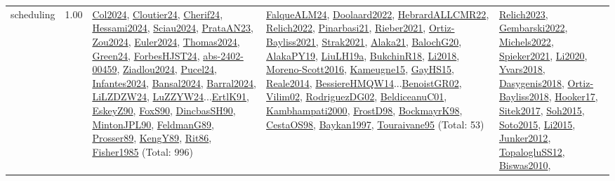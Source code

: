 {\begin{longtable}{p{3cm}r>{\raggedright\arraybackslash}p{6cm}>{\raggedright\arraybackslash}p{6cm}>{\raggedright\arraybackslash}p{8cm}}
\index{scheduling}\index{Scheduling!scheduling}scheduling &  1.00 & \hyperref[detail:Col2024]{Col2024}, \hyperref[detail:Cloutier24]{Cloutier24}, \hyperref[detail:Cherif24]{Cherif24}, \hyperref[detail:Hessami2024]{Hessami2024}, \hyperref[detail:Sciau2024]{Sciau2024}, \hyperref[detail:PrataAN23]{PrataAN23}, \hyperref[detail:Zou2024]{Zou2024}, \hyperref[detail:Euler2024]{Euler2024}, \hyperref[detail:Thomas2024]{Thomas2024}, \hyperref[detail:Green24]{Green24}, \hyperref[detail:ForbesHJST24]{ForbesHJST24}, \hyperref[detail:abs-2402-00459]{abs-2402-00459}, \hyperref[detail:Ziadlou2024]{Ziadlou2024}, \hyperref[detail:Pucel24]{Pucel24}, \hyperref[detail:Infantes2024]{Infantes2024}, \hyperref[detail:Bansal2024]{Bansal2024}, \hyperref[detail:Barral2024]{Barral2024}, \hyperref[detail:LiLZDZW24]{LiLZDZW24}, \hyperref[detail:LuZZYW24]{LuZZYW24}...\hyperref[detail:ErtlK91]{ErtlK91}, \hyperref[detail:EskeyZ90]{EskeyZ90}, \hyperref[detail:FoxS90]{FoxS90}, \hyperref[detail:DincbasSH90]{DincbasSH90}, \hyperref[detail:MintonJPL90]{MintonJPL90}, \hyperref[detail:FeldmanG89]{FeldmanG89}, \hyperref[detail:Prosser89]{Prosser89}, \hyperref[detail:KengY89]{KengY89}, \hyperref[detail:Rit86]{Rit86}, \hyperref[detail:Fisher1985]{Fisher1985} (Total: 996) & \hyperref[detail:FalqueALM24]{FalqueALM24}, \hyperref[detail:Doolaard2022]{Doolaard2022}, \hyperref[detail:HebrardALLCMR22]{HebrardALLCMR22}, \hyperref[detail:Relich2022]{Relich2022}, \hyperref[detail:Pinarbasi21]{Pinarbasi21}, \hyperref[detail:Rieber2021]{Rieber2021}, \hyperref[detail:Ortiz-Bayliss2021]{Ortiz-Bayliss2021}, \hyperref[detail:Strak2021]{Strak2021}, \hyperref[detail:Alaka21]{Alaka21}, \hyperref[detail:BalochG20]{BalochG20}, \hyperref[detail:AlakaPY19]{AlakaPY19}, \hyperref[detail:LiuLH19a]{LiuLH19a}, \hyperref[detail:BukchinR18]{BukchinR18}, \hyperref[detail:Li2018]{Li2018}, \hyperref[detail:Moreno-Scott2016]{Moreno-Scott2016}, \hyperref[detail:Kameugne15]{Kameugne15}, \hyperref[detail:GayHS15]{GayHS15}, \hyperref[detail:Reale2014]{Reale2014}, \hyperref[detail:BessiereHMQW14]{BessiereHMQW14}...\hyperref[detail:BenoistGR02]{BenoistGR02}, \hyperref[detail:Vilim02]{Vilim02}, \hyperref[detail:RodriguezDG02]{RodriguezDG02}, \hyperref[detail:BeldiceanuC01]{BeldiceanuC01}, \hyperref[detail:Kambhampati2000]{Kambhampati2000}, \hyperref[detail:FrostD98]{FrostD98}, \hyperref[detail:BockmayrK98]{BockmayrK98}, \hyperref[detail:CestaOS98]{CestaOS98}, \hyperref[detail:Baykan1997]{Baykan1997}, \hyperref[detail:Touraivane95]{Touraivane95} (Total: 53) & \hyperref[detail:Relich2023]{Relich2023}, \hyperref[detail:Gembarski2022]{Gembarski2022}, \hyperref[detail:Michels2022]{Michels2022}, \hyperref[detail:Spieker2021]{Spieker2021}, \hyperref[detail:Li2020]{Li2020}, \hyperref[detail:Yvars2018]{Yvars2018}, \hyperref[detail:Dasygenis2018]{Dasygenis2018}, \hyperref[detail:Ortiz-Bayliss2018]{Ortiz-Bayliss2018}, \hyperref[detail:Hooker17]{Hooker17}, \hyperref[detail:Sitek2017]{Sitek2017}, \hyperref[detail:Soh2015]{Soh2015}, \hyperref[detail:Soto2015]{Soto2015}, \hyperref[detail:Li2015]{Li2015}, \hyperref[detail:Junker2012]{Junker2012}, \hyperref[detail:TopalogluSS12]{TopalogluSS12}, \hyperref[detail:Biswas2010]{Biswas2010}, 
\end{longtable}}
